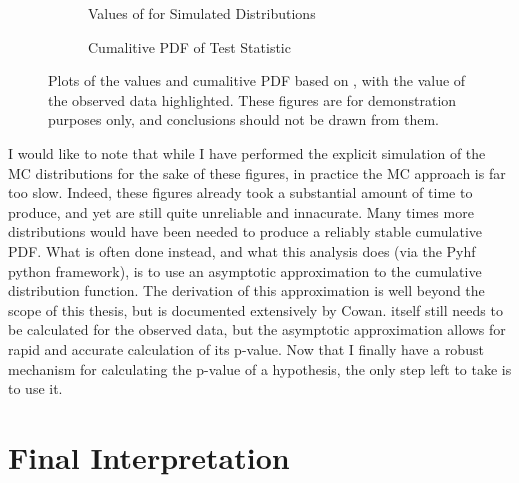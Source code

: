     \begin{figure} %
        \centering
        \begin{subfigure}{0.4\textwidth} 
             
            \caption{Values of \qtil for Simulated Distributions}
            \label{fig:qtil:pdf}
        \end{subfigure}
        \begin{subfigure}{0.4\textwidth}
             
            \caption{Cumalitive PDF of \qtil Test Statistic}
            \label{fig:qtil:Cpdf}
        \end{subfigure}
        \caption{
            Plots of the values and cumalitive PDF based on \qtil,
                with the \qtil value of the observed data highlighted.
            These figures are for demonstration purposes only,
                and conclusions should not be drawn from them.
        }
    \end{figure}

    I would like to note that while I have performed the explicit simulation of the MC distributions for the sake of these figures,
        in practice the MC approach is far too slow.
    Indeed, these figures already took a substantial amount of time to produce, and yet are still quite unreliable and innacurate.
    Many times more distributions would have been needed to produce a reliably stable cumulative PDF.
    What is often done instead, and what this analysis does (via the Pyhf python framework),
        is to use an asymptotic approximation to the \qtil cumulative distribution function.
    The derivation of this approximation is well beyond the scope of this thesis,
        but is documented extensively by Cowan\cite{asymptotic_formulae_for_likelihood}.
    \qtil itself still needs to be calculated for the observed data,
        but the asymptotic approximation allows for rapid and accurate calculation of its p-value.
    Now that I finally have a robust mechanism for calculating the p-value of a hypothesis,
        the only step left to take is to use it.

\FloatBarrier
\section{Final Interpretation}

